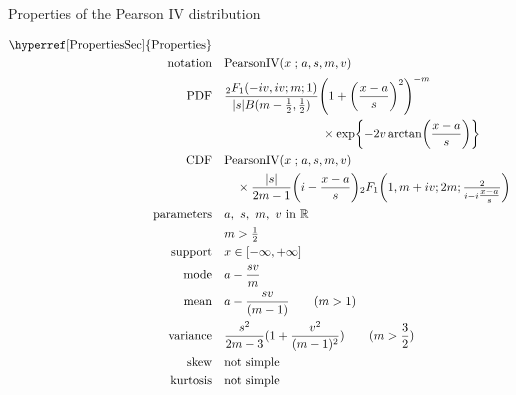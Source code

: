 

\begin{table*}[t!]
 \caption[Pearson  IV distribution -- Properties]{Properties of the Pearson  IV distribution}

\begin{align*}
\text{\hyperref[PropertiesSec]{Properties}}  \quad& \\
\text{notation} \quad & \text{PearsonIV}(x \given a,s, m,v)  
\\
\text{PDF}\quad &    \frac{{}_{2}F_1(-i v, i v ; m;1)  }{|s| B(m-\frac{1}{2}, \frac{1}{2} )} \Left( 1 +\Left( \frac{x-a}{s}\Right)^2 \Right)^{-m}
\\ \notag & \qquad \qquad \qquad \qquad \times \exp \Left\{ - 2 v \arctan \Left( \frac{x-a}{s}\Right) \Right\}
\checked
\\
\text{CDF} \quad  &    \text{PearsonIV}(x\given a,s, m,v)  \\ & \quad  \times \frac{|s|}{2m-1}\Left( i - \frac{x-a}{s}\Right) {}_2F_1\Left(1,m+iv; 2m; \tfrac{2}{i-i\tfrac{x-a}{s}} \Right) \checked
\\
\text{parameters}\quad &   a,\  s,\  m,\ v \text{ in } \Real
\\ & m>\tfrac{1}{2}
\\
\text{support} \quad &   x \in [-\infty, + \infty]
\\
\text{mode} \quad  & a - \frac{sv}{m}  \checked
\\
\text{mean} \quad  &  a - \frac{sv}{(m-1)} \qquad (m>1) \checked
\\
\text{variance} \quad  & \frac{s^2}{2m-3} (1 + \frac{v^2}{(m-1)^2})  \qquad (m>\frac{3}{2}) \checked
\\
\text{skew} \quad  &  \text{not simple}
\\
\text{kurtosis} \quad  &  \text{not simple}
\end{align*}
\end{table*}






